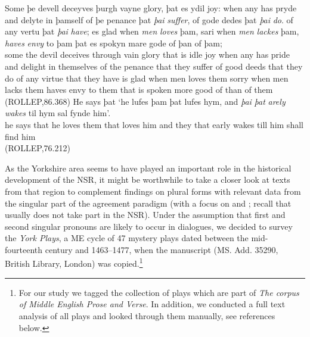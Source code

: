 \documentclass[output=paper]{langsci/langscibook}
\begin{document}
\ea
\ea
\gll Some þe devell deceyves þurgh vayne glory, þat es ydil joy: when any has pryde and delyte in þamself of þe penance þat \textit{þai} \textit{suffer}, of gode dedes þat \textit{þai} \textit{do}. of any vertu 	þat \textit{þai} \textit{have}; es glad when \textit{men} \textit{loves} þam, sari when \textit{men} \textit{lackes} þam, \textit{haves} \textit{envy} to þam þat es spokyn mare gode of þan of þam;\\
some the devil deceives through vain glory that is idle joy when any has pride and delight in themselves of the penance that they suffer of good deeds that they do of any virtue that they have is glad when men loves them sorry when men lacks them haves envy to them that is spoken more good of than of them\\
\glt (ROLLEP,86.368)
\ex
\gll He says þat `he lufes þam þat lufes hym, and \textit{þai} \textit{þat} \textit{arely} \textit{wakes} til hym sal fynde him'. \\
he says that he loves them that loves him and they that early wakes till him shall find him\\
\glt (ROLLEP,76.212)
\z
\z

As the Yorkshire area seems to have played an important role in the historical
development of the \gls{NSR}, it might be worthwhile to take a closer look at
texts from that region to complement 
findings on plural forms with relevant data from the singular part of the
agreement paradigm (with a focus on \Fsg{} and \Ssg{}; recall that \Tsg{}
usually does not take part in the \gls{NSR}). Under the assumption that first
and second singular pronouns are likely to occur in dialogues, we decided to
survey the \emph{York Plays}, a \gls{ME} cycle of 47 mystery plays dated between the
mid-fourteenth century and 1463--1477, when the manuscript (MS. Add. 35290,
British Library, London) was copied.\footnote{For our study we tagged the
    collection of plays which are part of \emph{The corpus of Middle English Prose
    and Verse}. In addition, we conducted a full text analysis of all plays and
looked through them manually, see references below.}
\end{document}
